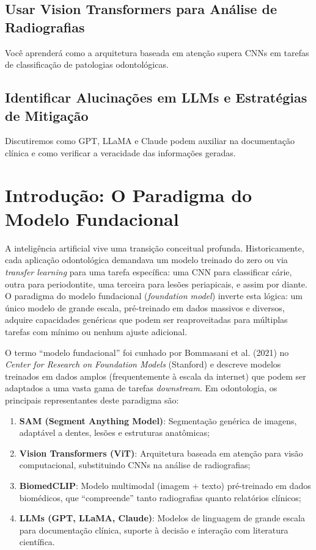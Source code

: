 \subsection{Usar Vision Transformers para Análise de Radiografias}
Você aprenderá como a arquitetura baseada em atenção supera CNNs em tarefas de classificação de patologias odontológicas.

\subsection{Identificar Alucinações em LLMs e Estratégias de Mitigação}
Discutiremos como GPT, LLaMA e Claude podem auxiliar na documentação clínica e como verificar a veracidade das informações geradas.

\section{Introdução: O Paradigma do Modelo Fundacional}

A inteligência artificial vive uma transição conceitual profunda. Historicamente, cada aplicação odontológica demandava um modelo treinado do zero ou via \textit{transfer learning} para uma tarefa específica: uma CNN para classificar cárie, outra para periodontite, uma terceira para lesões periapicais, e assim por diante. O paradigma do modelo fundacional (\textit{foundation model}) inverte esta lógica: um único modelo de grande escala, pré-treinado em dados massivos e diversos, adquire capacidades genéricas que podem ser reaproveitadas para múltiplas tarefas com mínimo ou nenhum ajuste adicional.

O termo ``modelo fundacional'' foi cunhado por Bommasani et al. (2021) no \textit{Center for Research on Foundation Models} (Stanford) e descreve modelos treinados em dados amplos (frequentemente à escala da internet) que podem ser adaptados a uma vasta gama de tarefas \textit{downstream}. Em odontologia, os principais representantes deste paradigma são:

\begin{enumerate}
    \item \textbf{SAM (Segment Anything Model)}: Segmentação genérica de imagens, adaptável a dentes, lesões e estruturas anatômicas;
    \item \textbf{Vision Transformers (ViT)}: Arquitetura baseada em atenção para visão computacional, substituindo CNNs na análise de radiografias;
    \item \textbf{BiomedCLIP}: Modelo multimodal (imagem + texto) pré-treinado em dados biomédicos, que ``compreende'' tanto radiografias quanto relatórios clínicos;
    \item \textbf{LLMs (GPT, LLaMA, Claude)}: Modelos de linguagem de grande escala para documentação clínica, suporte à decisão e interação com literatura científica.
\end{enumerate}


